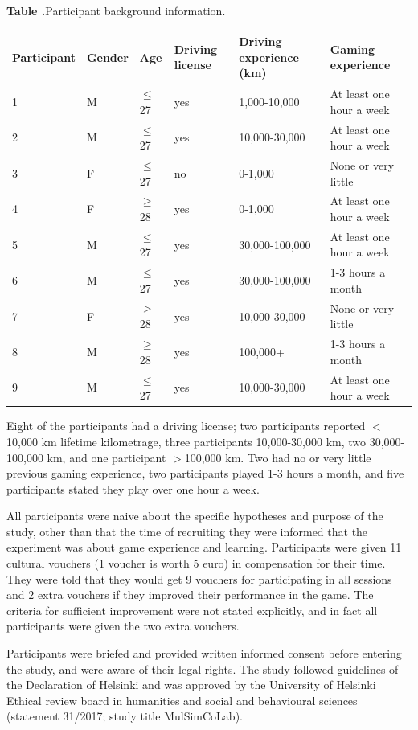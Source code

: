 \documentclass{frontierstyle/frontiersSCNS}
\begin{document}
\begin{table}[ht]
  \centering
  \textbf{\label{tab:Participants} Table .}{Participant background information.}
  \begin{tabular}{llllll}
  \hline
  Participant & Gender & Age & Driving license & Driving experience (km) & Gaming experience \\
  \hline
  1 & M & $\leq$27 & yes & 1,000-10,000 & At least one hour a week \\
  2 & M & $\leq$27 & yes & 10,000-30,000 & At least one hour a week \\
  3 & F & $\leq$27 & no & 0-1,000 & None or very little \\
  4 & F & $\geq$28 & yes & 0-1,000 & At least one hour a week \\
  5 & M & $\leq$27 & yes & 30,000-100,000 & At least one hour a week \\
  6 & M & $\leq$27 & yes & 30,000-100,000 & 1-3 hours a month \\
  7 & F & $\geq$28 & yes & 10,000-30,000 & None or very little \\
  8 & M & $\geq$28 & yes & 100,000+ & 1-3 hours a month \\
  9 & M & $\leq$27 & yes & 10,000-30,000 & At least one hour a week \\
  \hline
  \end{tabular}
\end{table}

Eight of the participants had a driving license; two participants reported $<$10,000 km lifetime kilometrage, three participants 10,000-30,000 km, two 30,000-100,000 km, and one participant $>$100,000 km. Two had no or very little previous gaming experience, two participants played 1-3 hours a month, and five participants stated they play over one hour a week.

All participants were naive about the specific hypotheses and purpose of the study, other than that the time of recruiting they were informed that the experiment was about game experience and learning. Participants were given 11 cultural vouchers (1 voucher is worth 5 euro) in compensation for their time. They were told that they would get 9 vouchers for participating in all sessions and 2 extra vouchers if they improved their performance in the game. The criteria for sufficient improvement were not stated explicitly, and in fact all participants were given the two extra vouchers.

Participants were briefed and provided written informed consent before entering the study, and were aware of their legal rights. The study followed guidelines of the Declaration of Helsinki and was approved by the University of Helsinki Ethical review board in humanities and social and behavioural sciences (statement 31/2017; study title MulSimCoLab).
\end{document}
